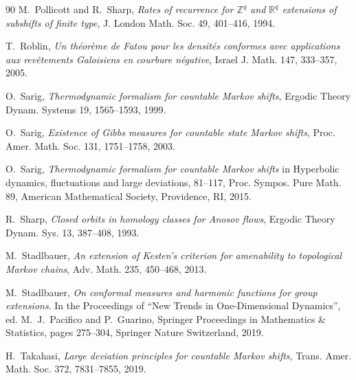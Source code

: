 \documentclass[11pt,letterpaper]{amsart}
\theoremstyle{definition}
\numberwithin{equation}{section}
\numberwithin{theorem}{section}
\def\Z{\mathbb{Z}}
\def\R{\mathbb{R}}
\def\R{\mathbb R}
\def\Z{\mathbb Z}
\begin{document}
\begin{thebibliography}{90}
M.~Pollicott and R.~Sharp,
\emph{Rates of recurrence for $\Z^q$ and $\R^q$ extensions of subshifts of finite type},
J. London Math. Soc. 49, 401--416, 1994.

T.~Roblin,
\emph{Un th\'eor\`eme de Fatou pour les densit\'es conformes avec applications
aux rev\^etements Galoisiens en courbure n\'egative},
Israel J. Math. 147, 333--357, 2005.


O.~Sarig,
\emph{Thermodynamic formalism for countable Markov shifts},
Ergodic Theory Dynam. Systems 19, 1565--1593, 1999.


O.~Sarig,
\emph{Existence of Gibbs measures for countable state Markov shifts},
Proc. Amer. Math. Soc. 131, 1751--1758, 2003.

O.~Sarig,
\emph{Thermodynamic formalism for countable Markov shifts} in Hyperbolic dynamics, fluctuations
and large deviations, 81--117,
Proc. Sympos. Pure Math. 89, American Mathematical Society, Providence, RI, 2015.


R.~Sharp,
\emph{Closed orbits in homology classes for Anosov flows},
Ergodic Theory Dynam. Sys. 13, 387--408, 1993.


M.~Stadlbauer,
\emph{An extension of Kesten's criterion for amenability to topological Markov chains},
Adv. Math. 235, 450--468, 2013.


M.~Stadlbauer,
\emph{On conformal measures and harmonic functions for group extensions}.
In the Proceedings of ``New Trends in One-Dimensional Dynamics'', ed. M.~J.~Pacifico
and P.~Guarino, Springer Proceedings in Mathematics \& Statistics, pages 275--304,
Springer Nature Switzerland, 2019.


H.~Takahasi,
\emph{Large deviation principles for countable Markov shifts},
Trans. Amer. Math. Soc. 372, 7831--7855, 2019.



\end{thebibliography}
\end{document}
